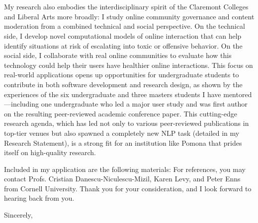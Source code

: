 \documentclass[12pt]{letter}
\begin{document}
\begin{letter}{
\department \\
\schoolnamelong \\
\schooladdress
}
My research also embodies the interdisciplinary spirit of the Claremont Colleges and Liberal Arts more broadly: I study online community governance and content moderation from a combined technical and social perspective.
On the technical side, I develop novel computational models of online interaction that can help identify situations at risk of escalating into toxic or offensive behavior.
On the social side, I collaborate with real online communities to evaluate how this technology could help their users have healthier online interactions.
This focus on real-world applications opens up opportunities for undergraduate students to contribute in both software development and research design, as shown by the experiences of the six undergraduate and three masters students I have mentored---including one undergraduate who led a major user study and was first author on the resulting peer-reviewed academic conference paper.
This cutting-edge research agenda, which has led not only to various peer-reviewed publications in top-tier venues but also spawned a completely new NLP task (detailed in my Research Statement), is a strong fit for an institution like Pomona that prides itself on high-quality research.

Included in my application are the following materials: \materials
For references, you may contact Profs. Cristian Danescu-Niculescu-Mizil, Karen Levy, and Peter Enns from Cornell University.
Thank you for your consideration, and I look forward to hearing back from you.

\closing{Sincerely,}

\end{letter}
\end{document}
